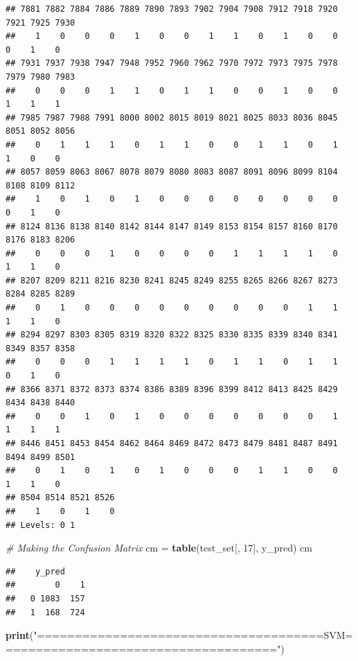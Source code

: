 \documentclass[
]{article}
\newenvironment{Shaded}{\begin{snugshade}}{\end{snugshade}}
\newcommand{\CommentTok}[1]{\textcolor[rgb]{0.56,0.35,0.01}{\textit{#1}}}
\newcommand{\DecValTok}[1]{\textcolor[rgb]{0.00,0.00,0.81}{#1}}
\newcommand{\KeywordTok}[1]{\textcolor[rgb]{0.13,0.29,0.53}{\textbf{#1}}}
\newcommand{\NormalTok}[1]{#1}
\newcommand{\StringTok}[1]{\textcolor[rgb]{0.31,0.60,0.02}{#1}}
\begin{document}
\begin{verbatim}
## 7881 7882 7884 7886 7889 7890 7893 7902 7904 7908 7912 7918 7920 7921 7925 7930 
##    1    0    0    0    1    0    0    1    1    0    1    0    0    0    1    0 
## 7931 7937 7938 7947 7948 7952 7960 7962 7970 7972 7973 7975 7978 7979 7980 7983 
##    0    0    0    1    1    0    1    1    0    0    1    0    0    1    1    1 
## 7985 7987 7988 7991 8000 8002 8015 8019 8021 8025 8033 8036 8045 8051 8052 8056 
##    0    1    1    1    0    1    1    0    0    1    1    0    1    1    0    0 
## 8057 8059 8063 8067 8078 8079 8080 8083 8087 8091 8096 8099 8104 8108 8109 8112 
##    1    0    1    0    1    0    0    0    0    0    0    0    0    0    1    0 
## 8124 8136 8138 8140 8142 8144 8147 8149 8153 8154 8157 8160 8170 8176 8183 8206 
##    0    0    0    1    0    0    0    0    1    1    1    1    0    1    1    0 
## 8207 8209 8211 8216 8230 8241 8245 8249 8255 8265 8266 8267 8273 8284 8285 8289 
##    0    1    0    0    0    0    0    0    0    0    0    1    1    1    1    0 
## 8294 8297 8303 8305 8319 8320 8322 8325 8330 8335 8339 8340 8341 8349 8357 8358 
##    0    0    0    1    1    1    1    0    1    1    0    1    1    0    1    0 
## 8366 8371 8372 8373 8374 8386 8389 8396 8399 8412 8413 8425 8429 8434 8438 8440 
##    0    0    1    0    1    0    0    0    0    0    0    0    1    1    1    1 
## 8446 8451 8453 8454 8462 8464 8469 8472 8473 8479 8481 8487 8491 8494 8499 8501 
##    0    1    0    1    0    1    0    0    0    1    1    0    0    1    1    0 
## 8504 8514 8521 8526 
##    1    0    1    0 
## Levels: 0 1
\end{verbatim}

\begin{Shaded}
\begin{Highlighting}[]
\CommentTok{# Making the Confusion Matrix}
\NormalTok{cm =}\StringTok{ }\KeywordTok{table}\NormalTok{(test_set[, }\DecValTok{17}\NormalTok{], y_pred)}
\NormalTok{cm}
\end{Highlighting}
\end{Shaded}

\begin{verbatim}
##    y_pred
##        0    1
##   0 1083  157
##   1  168  724
\end{verbatim}

\begin{Shaded}
\begin{Highlighting}[]
\KeywordTok{print}\NormalTok{(}\StringTok{"======================================SVM====================================="}\NormalTok{)}
\end{Highlighting}
\end{Shaded}
\end{document}
